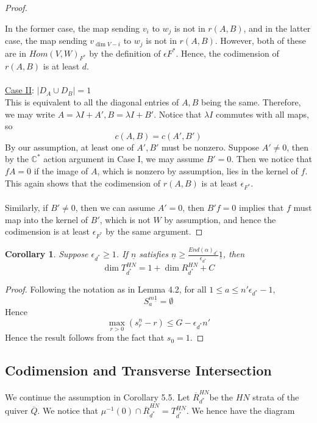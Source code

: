 \documentclass[12pt]{amsart}
\theoremstyle{plain}
\newtheorem{cor}[thm]{Corollary}
\theoremstyle{definition}
\theoremstyle{remark}
\begin{document}
\begin{proof}
\begin{enumerate}
\end{enumerate} 
In the former case, the map sending $v_i$ to $w_j$ is not in $r(A,B)$, and in the latter case, the map sending $v_{\dim V-i}$ to $w_j$ is not in $r(A,B)$. However, both of these are in $Hom(V,W)_{F^*}$ by the definition of $\epsilon{F^*}$. Hence, the codimension of $r(A,B)$ is at least $d$.
\\~\\ \underline{Case II}: $|D_A\cup D_B|=1$
\\ This is equivalent to all the diagonal entries of $A,B$ being the same. Therefore, we may write $A=\lambda I+A',B=\lambda I+B'$. Notice that $\lambda I$ commutes with all maps, so $$c(A,B)=c(A',B')$$ By our assumption, at least one of $A',B'$ must be nonzero. Suppose $A'\neq 0$, then by the $\mathbb C^*$ action argument in Case I, we may assume $B'=0$. Then we notice that $fA=0$ if the image of $A$, which is nonzero by assumption, lies in the kernel of $f$. This again shows that the codimension of $r(A,B)$ is at least $\epsilon_{F^*}$. 
\\~\\ Similarly, if $B'\neq 0$, then we can assume $A'=0$, then $B'f=0$ implies that $f$ must map into the kernel of $B'$, which is not $W$ by assumption, and hence the codimension is at least $\epsilon_{F^*}$ by the same argument.
\end{proof}
\begin{cor} Suppose $\epsilon_{d^*}\geq 1$. If $\underline{n}$ satisfies $\underline{n}\geq\displaystyle\frac{End(\alpha)_{d^*}}{\epsilon_{d^*}}\underline{1}$, then 
$$\dim T_{d^*}^{HN}=1+\dim R_{d^*}^{HN}+C$$
\end{cor}
\begin{proof}
Following the notation as in Lemma 4.2, for all $1\leq a\leq n'\epsilon_{d^*}-1$,
$$S_{a}^{m\underline{1}}=\emptyset$$
Hence 
$$\max_{r>0}(s_{r}^{\underline{n}}-r)\leq G-\epsilon_{d^*}n'$$
Hence the result follows from the fact that $s_0=1$.
\end{proof}
\subsection{Codimension and Transverse Intersection}
We continue the assumption in Corollary 5.5. Let $\overline{R}_{d^*}^{HN}$be the $HN$ strata of the quiver $\overline{Q}$. We notice that $\mu^{-1}(0)\cap \overline{R}_{d^*}^{HN}=T_{d^*}^{HN}$. We hence have the diagram
\end{document}
